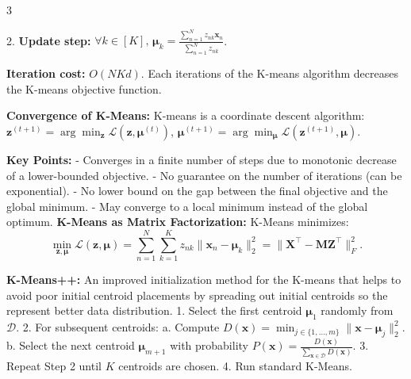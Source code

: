 \documentclass[landscape, 10pt]{article}
\begin{document}
\begin{multicols*}{3}
{2. \textbf{Update step:}  
$\forall k \in [K], \, \boldsymbol{\mu}_k = \frac{\sum_{n=1}^N z_{nk} \mathbf{x}_n}{\sum_{n=1}^N z_{nk}}$.  

\textbf{Iteration cost:} $O(NKd)$.
Each iterations of the K-means algorithm decreases the K-means objective function. 

\item \textbf{Convergence of K-Means:}  
K-means is a coordinate descent algorithm:  
$\mathbf{z}^{(t+1)} = \arg\min_{\mathbf{z}} \mathcal{L}(\mathbf{z}, \boldsymbol{\mu}^{(t)})$,  
$\boldsymbol{\mu}^{(t+1)} = \arg\min_{\boldsymbol{\mu}} \mathcal{L}(\mathbf{z}^{(t+1)}, \boldsymbol{\mu})$.  

\textbf{Key Points:}  
- Converges in a finite number of steps due to monotonic decrease of a lower-bounded objective.  
- No guarantee on the number of iterations (can be exponential).  
- No lower bound on the gap between the final objective and the global minimum.  
- May converge to a local minimum instead of the global optimum.
\textbf{K-Means as Matrix Factorization:}  
K-Means minimizes:  
\[
\min_{\mathbf{z}, \boldsymbol{\mu}} \mathcal{L}(\mathbf{z}, \boldsymbol{\mu}) = \sum_{n=1}^N \sum_{k=1}^K z_{nk} \|\mathbf{x}_n - \boldsymbol{\mu}_k\|_2^2 = \| \mathbf{X}^\top - \mathbf{M} \mathbf{Z}^\top \|_F^2.
\]

\textbf{K-Means++:}  
An improved initialization method for the K-means that helps to avoid poor initial centroid placements by spreading out initial centroids so the represent better data distribution.
1. Select the first centroid $\boldsymbol{\mu}_1$ randomly from $\mathcal{D}$.  
2. For subsequent centroids:  
   a. Compute $D(\mathbf{x}) = \min_{j \in \{1, \dots, m\}} \|\mathbf{x} - \boldsymbol{\mu}_j\|_2^2$.  
   b. Select the next centroid $\boldsymbol{\mu}_{m+1}$ with probability $P(\mathbf{x}) = \frac{D(\mathbf{x})}{\sum_{\mathbf{x} \in \mathcal{D}} D(\mathbf{x})}$.  
3. Repeat Step 2 until $K$ centroids are chosen.  
4. Run standard K-Means.


}
\end{multicols*}
\end{document}
